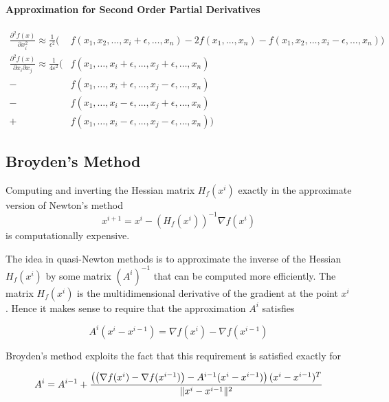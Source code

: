 \documentclass[11pt]{article}
\DeclarePairedDelimiter\norm{\lVert}{\rVert}
\begin{document}
\paragraph{Approximation for Second Order Partial Derivatives}
\begin{align*}
	\frac{\partial^2 f(x)}{\partial x_i^2} \approx \frac{1}{\epsilon^2} (&f(x_1,x_2, \dots, x_i + \epsilon, \dots, x_n) - 2f(x_1,\dots, x_n) - f(x_1,x_2, \dots, x_i - \epsilon, \dots, x_n))\\
	\frac{\partial^2 f(x)}{\partial x_i \partial x_j} \approx \frac{1}{4\epsilon^2} (&f(x_1,\dots, x_i + \epsilon, \dots, x_j + \epsilon ,\dots, x_n)\\
	 - &f(x_1,\dots, x_i + \epsilon, \dots, x_j - \epsilon ,\dots, x_n)\\
	 - &f(x_1,\dots, x_i - \epsilon, \dots, x_j + \epsilon ,\dots, x_n)\\
	 + &f(x_1,\dots, x_i - \epsilon, \dots, x_j - \epsilon ,\dots,x_n))
\end{align*}

\subsection{Broyden's Method}
Computing and inverting the Hessian matrix $H_f(x^i)$ exactly in the approximate version of Newton's method
\begin{equation*}
	x^{i+1} = x^i - \left( H_f(x^i) \right)^{-1}\nabla f(x^i)
\end{equation*}
\noindent
is computationally expensive.

The idea in quasi-Newton methods is to approximate the inverse of the Hessian $H_f(x^i)$ by some matrix $(A^i)^{-1}$ that can be computed more efficiently. The matrix $H_f(x^i)$ is the multidimensional derivative of the gradient at the point $x^i$ . Hence it makes sense to require that the approximation $A^i$ satisfies

\begin{equation*}
	A^i(x^i - x^{i-1}) = \nabla f(x^i) - \nabla f(x^{i-1})
\end{equation*}

\noindent
Broyden's method exploits the fact that this requirement is satisfied exactly for

\begin{equation*}
	A^i = A^{i-1} + \frac{\left(\left(\nabla f(x^i) - \nabla f(x^{i-1})\right) - A^{i-1} (x^i - x^{i-1})\right) (x^i - x^{i-1})^T}{\norm{x^i - x^{i-1}}^2}
\end{equation*}
\end{document}
